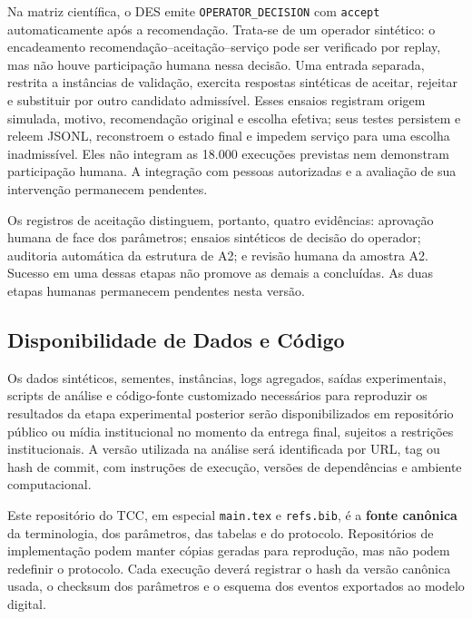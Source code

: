 \documentclass[
  12pt,
  oneside,
  a4paper,
  sumario=tradicional,
  brazil
]{abntex2}
\begin{document}
Na matriz cient\'ifica, o DES emite \texttt{OPERATOR\_DECISION} com \texttt{accept} automaticamente ap\'os a recomenda\c{c}\~ao. Trata-se de um operador sint\'etico: o encadeamento recomenda\c{c}\~ao--aceita\c{c}\~ao--servi\c{c}o pode ser verificado por replay, mas n\~ao houve participa\c{c}\~ao humana nessa decis\~ao. Uma entrada separada, restrita a inst\^ancias de valida\c{c}\~ao, exercita respostas sint\'eticas de aceitar, rejeitar e substituir por outro candidato admiss\'ivel. Esses ensaios registram origem simulada, motivo, recomenda\c{c}\~ao original e escolha efetiva; seus testes persistem e releem JSONL, reconstroem o estado final e impedem servi\c{c}o para uma escolha inadmiss\'ivel. Eles n\~ao integram as 18.000 execu\c{c}\~oes previstas nem demonstram participa\c{c}\~ao humana. A integra\c{c}\~ao com pessoas autorizadas e a avalia\c{c}\~ao de sua interven\c{c}\~ao permanecem pendentes.

Os registros de aceita\c{c}\~ao distinguem, portanto, quatro evid\^encias: aprova\c{c}\~ao humana de face dos par\^ametros; ensaios sint\'eticos de decis\~ao do operador; auditoria autom\'atica da estrutura de A2; e revis\~ao humana da amostra A2. Sucesso em uma dessas etapas n\~ao promove as demais a conclu\'idas. As duas etapas humanas permanecem pendentes nesta vers\~ao.

\subsection{Disponibilidade de Dados e Código}\label{sec:disponibilidade-dados-codigo}
Os dados sint\'eticos, sementes, inst\^ancias, logs agregados, sa\'idas experimentais, scripts de an\'alise e c\'odigo-fonte customizado necess\'arios para reproduzir os resultados da etapa experimental posterior ser\~ao disponibilizados em reposit\'orio p\'ublico ou m\'idia institucional no momento da entrega final, sujeitos a restri\c{c}\~oes institucionais. A vers\~ao utilizada na an\'alise ser\'a identificada por URL, tag ou hash de commit, com instru\c{c}\~oes de execu\c{c}\~ao, vers\~oes de depend\^encias e ambiente computacional.

Este reposit\'orio do TCC, em especial \texttt{main.tex} e \texttt{refs.bib}, \'e a
\textbf{fonte can\^onica} da terminologia, dos par\^ametros, das tabelas e do protocolo.
Reposit\'orios de implementa\c{c}\~ao podem manter c\'opias geradas para reprodu\c{c}\~ao,
mas n\~ao podem redefinir o protocolo. Cada execu\c{c}\~ao dever\'a registrar o hash da
vers\~ao can\^onica usada, o checksum dos par\^ametros e o esquema dos eventos exportados ao
modelo digital.
\end{document}
